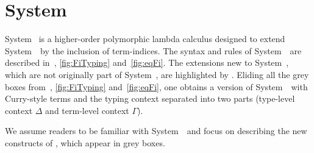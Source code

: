 \section{System \Fi} \label{sec:Fi}
System \Fi\ is a higher-order polymorphic lambda calculus 
designed to extend System~\Fw\ by the inclusion of term-indices.
The syntax and rules of System~\Fi\ are described in~,
\ref{fig:FiTyping} and~\ref{fig:eqFi}. 
The extensions new to System~\Fi, which are not originally part of System~\Fw, 
are highlighted by .
Eliding all the grey boxes from~, \ref{fig:FiTyping}
and~\ref{fig:eqFi}, one obtains a version of System~\Fw\ 
with Curry-style terms and the typing context separated into two parts
(type-level context $\Delta$ and term-level context $\Gamma$).

We assume readers to be familiar with System~\Fw\
and focus on describing the new constructs of \Fi, which appear in grey boxes.

